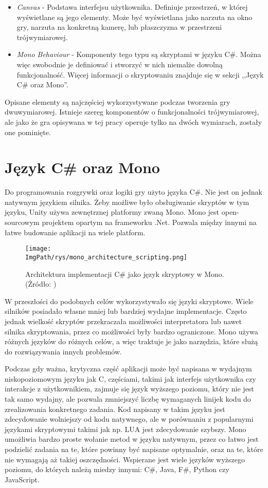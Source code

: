\documentclass[a4paper,12pt,twoside,openany]{report}
\newcommand{\ImgPath}{.}
\begin{document}
\begin{itemize}
    \item \textit{Canvas} - Podstawa interfejsu użytkownika. Definiuje przestrzeń, w której wyświetlane są jego elementy. Może być wyświetlana jako narzuta na okno gry, narzuta na konkretną kamerę, lub płaszczyzna w przestrzeni trójwymiarowej.
    \item \textit{Mono Behaviour} - Komponenty tego typu są skryptami w języku C\#. Można więc swobodnie je definiować i stworzyć w nich niemalże dowolną funkcjonalność. Więcej informacji o skryptowaniu znajduje się w sekcji ,,Język C\# oraz Mono''.
\end{itemize}
Opisane elementy są najczęściej wykorzystywane podczas tworzenia gry dwuwymiarowej. Istnieje szereg komponentów o funkcjonalności trójwymiarowej, ale jako że gra opisywana w tej pracy operuje tylko na dwóch wymiarach, zostały one pominięte.

\section{Język C\# oraz Mono}

Do programowania rozgrywki oraz logiki gry użyto języka C\#. Nie jest on jednak natywnym językiem silnika. Żeby możliwe było obsługiwanie skryptów w tym języku, Unity używa zewnętrznej platformy zwaną Mono. Mono jest open-sourcowym projektem opartym na frameworku .Net\cite{about_mono}. Pozwala między innymi na łatwe budowanie aplikacji na wiele platform.

\begin{figure}[!htbp]
	\begin{center}
\centering
\texttt{[image: \\ImgPath/rys/mono\_architecture\_scripting.png]}
\end{center}
	\caption{Architektura implementacji C\# jako język skryptowy w Mono. (Żródło: \cite{mono_scrpiting})}
	\label{mono_architecture_scripting}
\end{figure}

W przeszłości do podobnych celów wykorzystywało się języki skryptowe. Wiele silników posiadało własne mniej lub bardziej wydajne implementacje. Często jednak wielkość skryptów przekraczała możliwości interpretatora lub nawet silnika skryptowania, przez co możliwości były bardzo ograniczone. Mono używa różnych języków do różnych celów, a więc traktuje je jako narzędzia, które służą do rozwiązywania innych problemów.

Podczas gdy ważna, krytyczna część aplikacji może być napisana w wydajnym niskopoziomowym języku jak C, częściami, takimi jak interfejs użytkownika czy interakcje z użytkownikiem, zajmuje się język wyższego poziomu, który nie jest tak samo wydajny, ale pozwala zmniejszyć liczbę wymaganych linijek kodu do zrealizowania konkretnego zadania. Kod napisany w takim języku jest zdecydowanie wolniejszy od kodu natywnego, ale w porównaniu z popularnymi językami skryptowymi takimi jak np. LUA jest zdecydowanie szybszy. Mono umożliwia bardzo proste wołanie metod w języku natywnym, przez co łatwo jest podzielić zadania na te, które powinny być napisane optymalnie, oraz na te, które nie wymagają aż takiej oszczędności. Wspierane jest wiele języków wyższego poziomu, do których należą miedzy innymi: C\#, Java, F\#, Python czy JavaScript.
\end{document}
